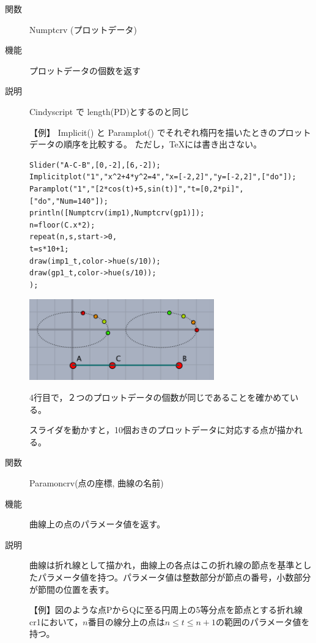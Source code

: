 \documentclass[papersize,a4paper,12pt,uplatex]{jsarticle}
\begin{document}
\begin{description}
\hypertarget{numptcrv}{}
\item[関数]Numptcrv (プロットデータ)
\item[機能]プロットデータの個数を返す
\item[説明]Cindyscript で length(PD)とするのと同じ

\vspace{\baselineskip}
【例】 Implicit() と Paramplot() でそれぞれ楕円を描いたときのプロットデータの順序を比較する。
ただし，TeXには書き出さない。

\begin{verbatim}
Slider("A-C-B",[0,-2],[6,-2]);
Implicitplot("1","x^2+4*y^2=4","x=[-2,2]","y=[-2,2]",["do"]);
Paramplot("1","[2*cos(t)+5,sin(t)]","t=[0,2*pi]",["do","Num=140"]);
println([Numptcrv(imp1),Numptcrv(gp1)]);
n=floor(C.x*2);
repeat(n,s,start->0,
t=s*10+1;
draw(imp1_t,color->hue(s/10));
draw(gp1_t,color->hue(s/10));
);
\end{verbatim}

\begin{center}
\includegraphics[bb=0.00 0.00 305.02 133.01,width=8cm]{Fig/numptcrv.pdf}
\end{center}

4行目で，２つのプロットデータの個数が同じであることを確かめている。

スライダを動かすと，10個おきのプロットデータに対応する点が描かれる。

\vspace{\baselineskip}
\hypertarget{paramoncrv}{}
\item[関数]Paramoncrv(点の座標, 曲線の名前)
\item[機能]曲線上の点のパラメータ値を返す。
\item[説明]曲線は折れ線として描かれ，曲線上の各点はこの折れ線の節点を基準としたパラメータ値を持つ。パラメータ値は整数部分が節点の番号，小数部分が節間の位置を表す。

\vspace{\baselineskip}
【例】図のような点PからQに至る円周上の5等分点を節点とする折れ線cr1において，$n$番目の線分上の点は$n\leq t\leq n+1$の範囲のパラメータ値を持つ。


\end{description}
\end{document}
